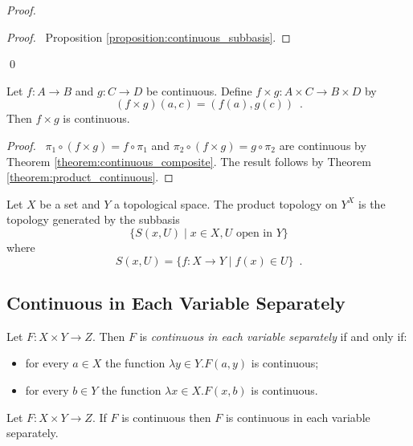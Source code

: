 \begin{proof}
    \pf
    \qedstep
    \begin{proof}
        \pf\ Proposition \ref{proposition:continuous_subbasis}.
    \end{proof}
    \qed
\end{proof}

\begin{proposition}
    Let $f : A \rightarrow B$ and $g : C \rightarrow D$ be continuous. Define $f \times g : A \times C \rightarrow B \times D$ by
    \[ (f \times g)(a,c) = (f(a), g(c)) \enspace . \]
    Then $f \times g$ is continuous.
\end{proposition}

\begin{proof}
    \pf\ $\pi_1 \circ (f \times g) = f \circ \pi_1$ and $\pi_2 \circ (f \times g) = g \circ \pi_2$ are continuous
    by Theorem \ref{theorem:continuous_composite}. The result follows by Theorem \ref{theorem:product_continuous}.
\end{proof}

\begin{proposition}
    Let $X$ be a set and $Y$ a topological space. The product topology on $Y^X$ is the topology generated by the subbasis
    \[ \{ S(x,U) \mid x \in X, U \text{ open in } Y \} \]
    where
    \[ S(x,U) = \{ f : X \rightarrow Y \mid f(x) \in U \} \enspace . \]
\end{proposition}

\subsection{Continuous in Each Variable Separately}

\begin{definition}
    Let $F : X \times Y \rightarrow Z$. Then $F$ is \emph{continuous in each
    variable separately} if and only if:
    \begin{itemize}
        \item for every $a \in X$ the function $\lambda y \in Y. F(a,y)$ is continuous;
        \item for every $b \in Y$ the function $\lambda x \in X. F(x,b)$ is continuous.
    \end{itemize}
\end{definition}

\begin{proposition}
    Let $F : X \times Y \rightarrow Z$. If $F$ is continuous then $F$ is continuous in each
    variable separately.
\end{proposition}

